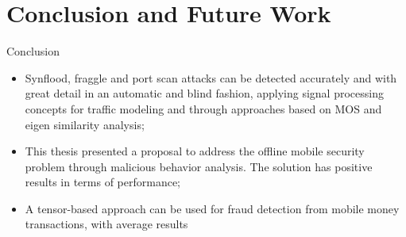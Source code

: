 \documentclass[newPxFont, numfooter, sectionpages]{beamer}
\begin{document}
\section{Conclusion and Future Work}
\begin{frame}[c]{Conclusion}

	\begin{itemize}
		\item Synflood, fraggle and port scan attacks can be detected accurately and with great detail in an automatic and blind fashion, applying signal processing concepts for traffic modeling and through approaches based on MOS and eigen similarity analysis;
		\item This thesis presented a proposal to address the offline mobile security problem through malicious behavior analysis. The solution has positive results in terms of performance;
		\item A tensor-based approach can be used for fraud detection from mobile money transactions, with average results
	\end{itemize}

\end{frame}
\end{document}
